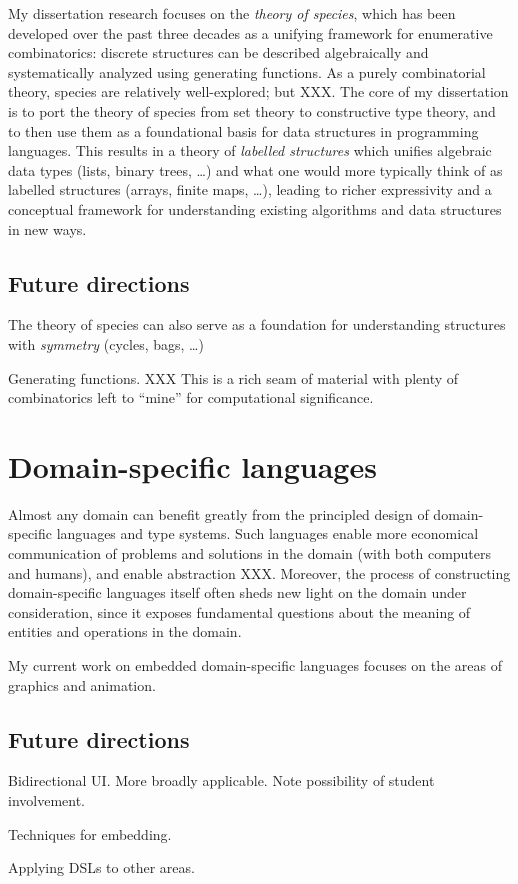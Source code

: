 \documentclass[12pt]{article}
\begin{document}
My dissertation research focuses on the \emph{theory of species},
which has been developed over the past three decades as a unifying
framework for enumerative combinatorics: discrete structures can be
described algebraically and systematically analyzed using generating
functions.  As a purely combinatorial theory, species are relatively
well-explored; but XXX.  The core of my dissertation is to port the
theory of species from set theory to constructive type theory, and to
then use them as a foundational basis for data structures in
programming languages. This results in a theory of \emph{labelled
  structures} which unifies algebraic data types (lists, binary trees,
\dots) and what one would more typically think of as labelled
structures (arrays, finite maps, \dots), leading to richer
expressivity and a conceptual framework for understanding existing
algorithms and data structures in new ways.

\subsection*{Future directions}

 The
theory of species can also serve as a foundation for understanding
structures with \emph{symmetry} (cycles, bags, \dots)

Generating functions. XXX This is a rich seam of material with plenty
of combinatorics left to ``mine'' for computational significance.

\section*{Domain-specific languages}
\label{sec:edsls}

Almost any domain can benefit greatly from the principled design of
domain-specific languages and type systems.  Such languages enable
more economical communication of problems and solutions in the domain
(with both computers and humans), and enable abstraction XXX.
Moreover, the process of constructing domain-specific languages itself
often sheds new light on the domain under consideration, since it
exposes fundamental questions about the meaning of entities and
operations in the domain.

My current work on embedded domain-specific languages focuses on the
areas of graphics and animation.

\subsection*{Future directions}

Bidirectional UI.  More broadly applicable.  Note possibility of
student involvement.

Techniques for embedding.

Applying DSLs to other areas.
\end{document}
